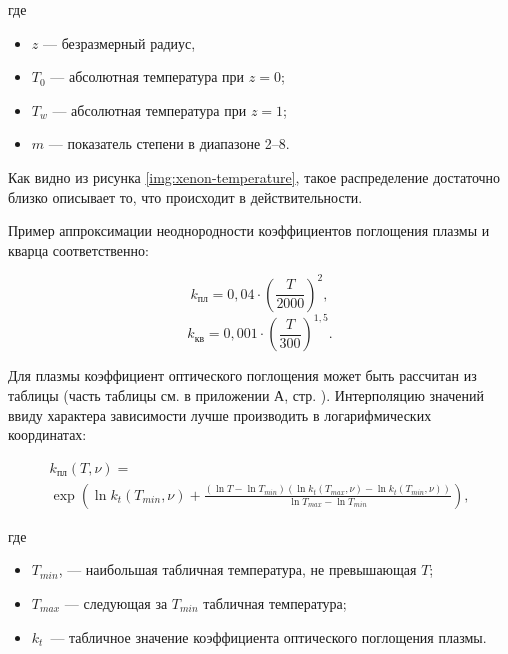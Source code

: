 \noindent где
\begin{itemize}
	\item $z$ — безразмерный радиус,
	\item $T_0$ — абсолютная температура при $z = 0$;
	\item $T_w$ — абсолютная температура при $z = 1$;
	\item $m$ — показатель степени в диапазоне 2–8.
\end{itemize}



Как видно из рисунка \ref{img:xenon-temperature}, такое распределение достаточно близко описывает то, что происходит в действительности.

Пример аппроксимации неоднородности коэффициентов поглощения плазмы и кварца соответственно:

\begin{equation}
	\label{eqn:absorption-coefficient-plasma}
	k_{\text{пл}} = 0,04 \cdot \left(\frac{T}{2000}\right)^2,
\end{equation}
\begin{equation}
	\label{eqn:absorption-coefficient-quartz}
	k_{\text{кв}} = 0,001 \cdot \left(\frac{T}{300}\right)^{1,5}.
\end{equation}

Для плазмы коэффициент оптического поглощения может быть рассчитан из таблицы (часть таблицы см. в приложении А, стр. \pageref{toc:attachment-a}).
Интерполяцию значений ввиду характера зависимости лучше производить в логарифмических координатах:

\begin{equation}
	\begin{matrix}
		k_{\text{пл}}(T, \nu) = \\
		\exp{\left(\ln{k_t(T_{min}, \nu)} + \frac{(\ln{T} - \ln{T_{min}})(\ln{k_t(T_{max}, \nu)} - \ln{k_t(T_{min}, \nu)})}{\ln{T_{max}} - \ln{T_{min}}}\right)},
	\end{matrix}
\end{equation}

\noindent где
\begin{itemize}
	\item $T_{min}$, — наибольшая табличная температура, не превышающая $T$;
	\item $T_{max}$ — следующая за $T_{min}$ табличная температура;
	\item $k_t$~— табличное значение коэффициента оптического поглощения плазмы.
\end{itemize}


